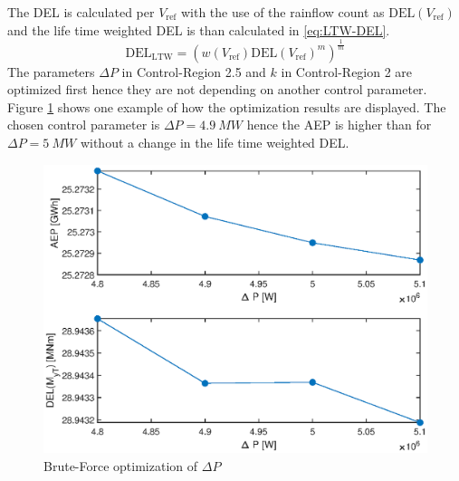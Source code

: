 The DEL is calculated per $V_{\text{ref}}$ with the use of the rainflow count as $\text{DEL}(V_{\text{ref}})$ and the life time weighted DEL is than calculated in \ref{eq:LTW-DEL}.
\begin{equation}
	\text{DEL}_{\text{LTW}} = \left(w(V_{\text{ref}})\text{DEL}(V_{\text{ref}})^m\right)^{\frac{1}{m}} 
	\label{eq:LTW-DEL}
\end{equation}
The parameters $\Delta P$ in Control-Region 2.5 and  $k$ in Control-Region 2 are optimized first hence they are not depending on another control parameter. Figure \ref{fig:DeltaP} shows one example of how the optimization results are displayed. The chosen control parameter is $\Delta P = \SI{4.9}{MW}$ hence the AEP is higher than for $\Delta P = \SI{5}{MW}$ without a change in the life time weighted DEL.
\begin{figure}[tbh]
	\centering	
	\includegraphics[width=12cm]{Figures/DeltaPopt.eps}
	\caption{Brute-Force optimization of $\Delta P$}
	\label{fig:DeltaP}
\end{figure}